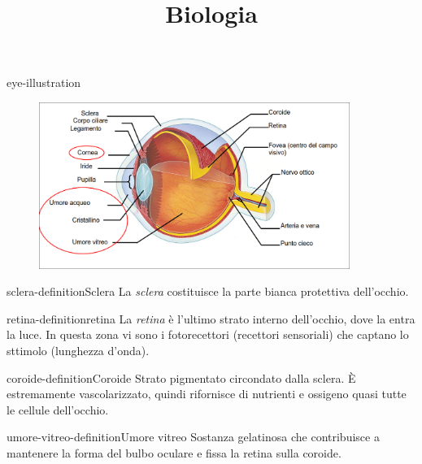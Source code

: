 \documentclass[preview]{standalone}
\begin{document}
\title{Biologia}
\genpage


\begin{snippet}{eye-illustration}
    \begin{center}
    \begin{figure}[ht]
        \centering
        \includegraphics[width=0.9\textwidth]{./resources/eye.png}
    \end{figure}
    \end{center}
\end{snippet}


\begin{snippetdefinition}{sclera-definition}{Sclera}
    La \textit{sclera} costituisce la parte bianca protettiva dell'occhio.
\end{snippetdefinition}

\begin{snippetdefinition}{retina-definition}{retina}
    La \textit{retina} è l'ultimo strato interno dell'occhio, dove la entra la luce.
    In questa zona vi sono i fotorecettori (recettori sensoriali) che captano lo sttimolo (lunghezza d'onda).
\end{snippetdefinition}

\begin{snippetdefinition}{coroide-definition}{Coroide}
    Strato pigmentato circondato dalla sclera. È estremamente vascolarizzato, quindi rifornisce
    di nutrienti e ossigeno quasi tutte le cellule dell'occhio.
\end{snippetdefinition}

\begin{snippetdefinition}{umore-vitreo-definition}{Umore vitreo}
    Sostanza gelatinosa che contribuisce a mantenere la forma del bulbo oculare e fissa la
    retina sulla coroide.
\end{snippetdefinition}
\end{document}
